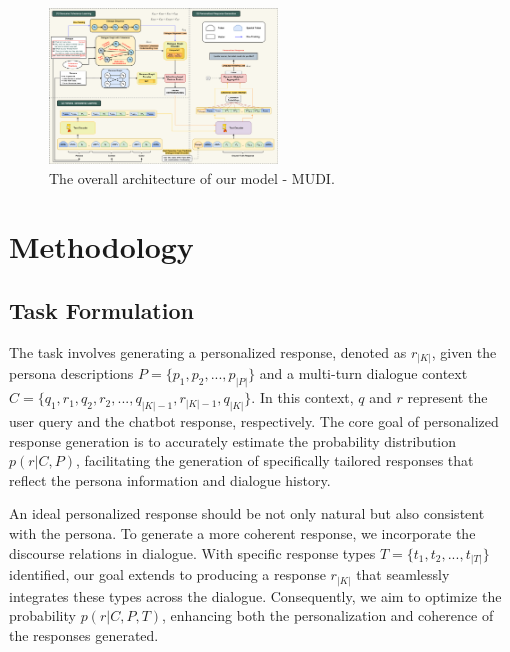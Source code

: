 \documentclass[letterpaper]{article} %
\begin{document}

\begin{figure}[ht]
    \centering
    \includegraphics[width=0.54\textwidth]{./images/research_model_arch-v4.png}
    \caption{The overall architecture of our model - MUDI.}
    \label{fig:proposed_model_arch}
\end{figure}

\section{Methodology}

\subsection{Task Formulation}
The task involves generating a personalized response, denoted as $r_{|K|}$, given the persona descriptions $P = \{p_{1}, p_{2}, ... , p_{|P|}\}$ and a multi-turn dialogue context $C = \{q_{1}, r_{1}, q_{2}, r_{2}, ... , q_{|K|−1}, r_{|K|−1}, q_{|K|}\}$. In this context, $q$ and $r$ represent the user query and the chatbot response, respectively. The core goal of personalized response generation is to accurately estimate the probability distribution $p(r | C, P)$, facilitating the generation of specifically tailored responses that reflect the persona information and dialogue history. 

An ideal personalized response should be not only natural but also consistent with the persona. To generate a more coherent response, we incorporate the discourse relations in dialogue. With specific response types $T = \{t_{1}, t_{2}, ... , t_{|T|}\}$ identified, our goal extends to producing a response $r_{|K|}$ that seamlessly integrates these types across the dialogue. Consequently, we aim to optimize the probability $p(r | C, P, T)$, enhancing both the personalization and coherence of the responses generated.
\end{document}
